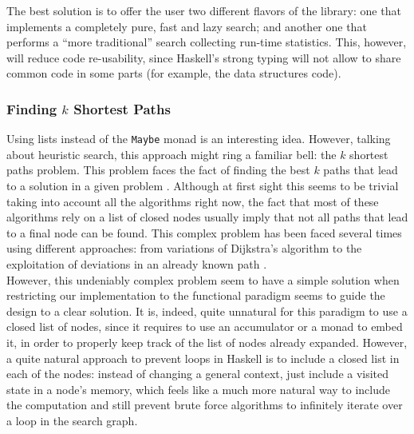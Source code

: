 The best solution is to offer the user two different flavors of the library:
one that implements a completely pure, fast and lazy search; and another one
that performs a ``more traditional'' search collecting run-time statistics.
This, however, will reduce code re-usability, since Haskell's strong typing
will not allow to share common code in some parts (for example, the data
structures code).\\

\subsubsection{Finding $k$ Shortest Paths}

Using lists instead of the \texttt{Maybe} monad is an interesting idea.
However, talking about heuristic search, this approach might ring a familiar
bell: the $k$ shortest paths problem. This problem faces the fact of finding
the best $k$ paths that lead to a solution in a given problem
\cite{eppstein-1998-finding}. Although at first sight this seems to be trivial
taking into account all the algorithms right now, the fact that most of these
algorithms rely on a list of closed nodes usually imply that not all paths that
lead to a final node can be found. This complex problem has been faced several
times using different approaches: from variations of Dijkstra's algorithm to
the exploitation of deviations in an already known path
\cite{dreyfus-1969-appraisal}.\\

However, this undeniably complex problem seem to have a simple solution when
restricting our implementation to the functional paradigm seems to guide the
design to a clear solution. It is, indeed, quite unnatural for this paradigm to
use a closed list of nodes, since it requires to use an accumulator or a monad
to embed it, in order to properly keep track of the list of nodes already
expanded. However, a quite natural approach to prevent loops in Haskell is to
include a closed list in each of the nodes: instead of changing a general
context, just include a visited state in a node's memory, which feels like a
much more natural way to include the computation and still prevent brute force
algorithms to infinitely iterate over a loop in the search graph.\\

